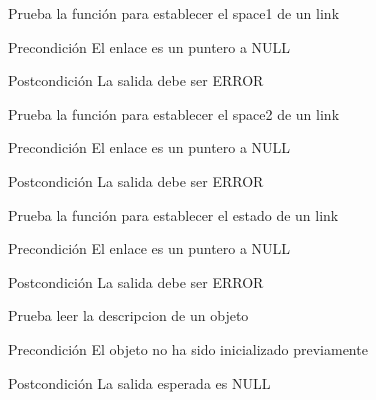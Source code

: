 \begin{DoxyRefList}
\item[\label{test__test000136}%
\hypertarget{test__test000136}{}%
Global \hyperlink{link__test_8c_a82e395ee3f20a612351e2a36a6c21913}{test2\-\_\-link\-\_\-set\-\_\-space1} ()]Prueba la función para establecer el space1 de un link \begin{DoxyPrecond}{Precondición}
El enlace es un puntero a N\-U\-L\-L 
\end{DoxyPrecond}
\begin{DoxyPostcond}{Postcondición}
La salida debe ser E\-R\-R\-O\-R  
\end{DoxyPostcond}

\item[\label{test__test000139}%
\hypertarget{test__test000139}{}%
Global \hyperlink{link__test_8c_a8d5608a414ed6987f6947437c8a1273e}{test2\-\_\-link\-\_\-set\-\_\-space2} ()]Prueba la función para establecer el space2 de un link \begin{DoxyPrecond}{Precondición}
El enlace es un puntero a N\-U\-L\-L 
\end{DoxyPrecond}
\begin{DoxyPostcond}{Postcondición}
La salida debe ser E\-R\-R\-O\-R  
\end{DoxyPostcond}

\item[\label{test__test000142}%
\hypertarget{test__test000142}{}%
Global \hyperlink{link__test_8c_ab21b54430d17035a8f883ccd7d748e9a}{test2\-\_\-link\-\_\-set\-\_\-state} ()]Prueba la función para establecer el estado de un link \begin{DoxyPrecond}{Precondición}
El enlace es un puntero a N\-U\-L\-L 
\end{DoxyPrecond}
\begin{DoxyPostcond}{Postcondición}
La salida debe ser E\-R\-R\-O\-R  
\end{DoxyPostcond}

\item[\label{test__test000188}%
\hypertarget{test__test000188}{}%
Global \hyperlink{object__test_8c_ad8c550bb28562251fb895df67418c9b0}{test2\-\_\-object\-\_\-\-Get\-\_\-\-Description} ()]Prueba leer la descripcion de un objeto \begin{DoxyPrecond}{Precondición}
El objeto no ha sido inicializado previamente 
\end{DoxyPrecond}
\begin{DoxyPostcond}{Postcondición}
La salida esperada es N\-U\-L\-L  
\end{DoxyPostcond}


\end{DoxyRefList}
